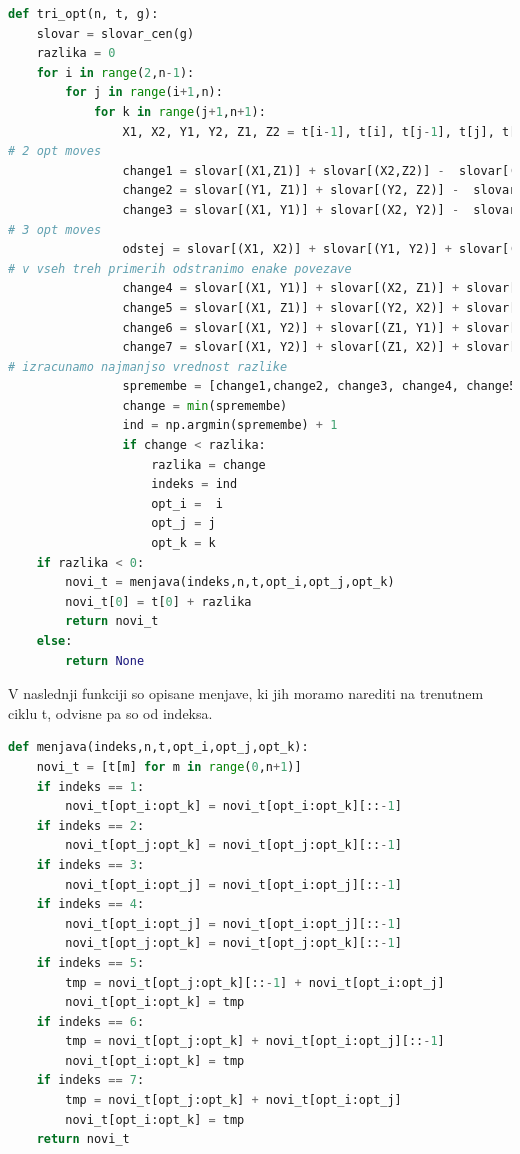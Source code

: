 \documentclass[12pt,a4paper]{amsart}
\theoremstyle{definition} %
\theoremstyle{plain} %
\begin{document}
\begin{lstlisting}[language=Python]
def tri_opt(n, t, g):
    slovar = slovar_cen(g)
    razlika = 0    
    for i in range(2,n-1):
        for j in range(i+1,n):
            for k in range(j+1,n+1):
                X1, X2, Y1, Y2, Z1, Z2 = t[i-1], t[i], t[j-1], t[j], t[k-1], t[k]
# 2 opt moves
                change1 = slovar[(X1,Z1)] + slovar[(X2,Z2)] -  slovar[(X1,X2)] - slovar[(Z1,Z2)]
                change2 = slovar[(Y1, Z1)] + slovar[(Y2, Z2)] -  slovar[(Y1, Y2)] - slovar[(Z1, Z2)] 
                change3 = slovar[(X1, Y1)] + slovar[(X2, Y2)] -  slovar[(X1, X2)] - slovar[(Y1, Y2)]
# 3 opt moves
                odstej = slovar[(X1, X2)] + slovar[(Y1, Y2)] + slovar[(Z1, Z2)]
# v vseh treh primerih odstranimo enake povezave
                change4 = slovar[(X1, Y1)] + slovar[(X2, Z1)] + slovar[(Y2, Z2)] -  odstej
                change5 = slovar[(X1, Z1)] + slovar[(Y2, X2)] + slovar[(Y1, Z2)] -  odstej
                change6 = slovar[(X1, Y2)] + slovar[(Z1, Y1)] + slovar[(X2, Z2)] -  odstej
                change7 = slovar[(X1, Y2)] + slovar[(Z1, X2)] + slovar[(Y1, Z2)] -  odstej
# izracunamo najmanjso vrednost razlike
                spremembe = [change1,change2, change3, change4, change5,change6,change7]
                change = min(spremembe)
                ind = np.argmin(spremembe) + 1
                if change < razlika:
                    razlika = change
                    indeks = ind
                    opt_i =  i
                    opt_j = j
                    opt_k = k
    if razlika < 0:
        novi_t = menjava(indeks,n,t,opt_i,opt_j,opt_k)
        novi_t[0] = t[0] + razlika
        return novi_t
    else:
        return None
\end{lstlisting}

V naslednji funkciji so opisane menjave, ki jih moramo narediti na trenutnem ciklu t, odvisne pa so od indeksa. 

\begin{lstlisting}[language=Python]
def menjava(indeks,n,t,opt_i,opt_j,opt_k):   
    novi_t = [t[m] for m in range(0,n+1)]
    if indeks == 1:
        novi_t[opt_i:opt_k] = novi_t[opt_i:opt_k][::-1]
    if indeks == 2:
        novi_t[opt_j:opt_k] = novi_t[opt_j:opt_k][::-1]
    if indeks == 3:
        novi_t[opt_i:opt_j] = novi_t[opt_i:opt_j][::-1]      
    if indeks == 4:
        novi_t[opt_i:opt_j] = novi_t[opt_i:opt_j][::-1]
        novi_t[opt_j:opt_k] = novi_t[opt_j:opt_k][::-1]      
    if indeks == 5:
        tmp = novi_t[opt_j:opt_k][::-1] + novi_t[opt_i:opt_j]
        novi_t[opt_i:opt_k] = tmp        
    if indeks == 6:
        tmp = novi_t[opt_j:opt_k] + novi_t[opt_i:opt_j][::-1]
        novi_t[opt_i:opt_k] = tmp      
    if indeks == 7:
        tmp = novi_t[opt_j:opt_k] + novi_t[opt_i:opt_j]
        novi_t[opt_i:opt_k] = tmp
    return novi_t
\end{lstlisting}
\end{document}
